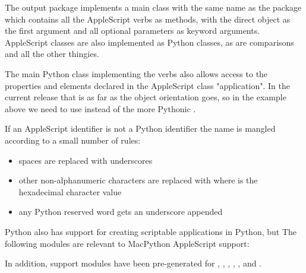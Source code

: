 The output package implements a main class with the same name as the
package which contains all the AppleScript verbs as methods, with the
direct object as the first argument and all optional parameters as
keyword arguments. AppleScript classes are also implemented as Python
classes, as are comparisons and all the other thingies.

The main
Python class implementing the verbs also allows access to the properties
and elements declared in the AppleScript class "application". In the
current release that is as far as the object orientation goes, so
in the example above we need to use
 instead of the more Pythonic
.


If an AppleScript identifier is not a Python identifier the name is
mangled according to a small number of rules:
\begin{itemize}
    \item spaces are replaced with underscores
    \item other non-alphanumeric characters are replaced with
     where  is the hexadecimal character value
    \item any Python reserved word gets an underscore appended
\end{itemize}

Python also has support for creating scriptable applications
in Python, but
The following modules are relevant to MacPython AppleScript support:

\localmoduletable

In addition, support modules have been pre-generated for
, , ,
, ,  and
.






